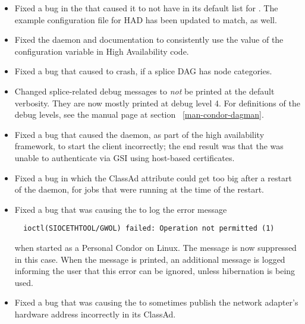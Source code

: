 \begin{itemize}
\item Fixed a bug in the  that caused it to not have
   in its default list for .
  The example
  configuration file for HAD has been updated to match, as well.

\item Fixed the  daemon and documentation to consistently
  use the value of the configuration variable 
   in High Availability code.

\item Fixed a bug that caused  to crash,
if a splice DAG has node categories.

\item Changed splice-related  debug messages
to \emph{not} be printed at the default verbosity.
They are now mostly printed at debug level 4.
For definitions of the debug levels, see the  manual
page at section~ \ref{man-condor-dagman}.

\item Fixed a bug that caused the  daemon,
  as part of the high availability framework,
  to start the  client incorrectly; the end result was
  that the  was unable to authenticate via GSI
  using host-based certificates.

\item Fixed a bug in which the ClassAd attribute 
  could get too big after a restart of the  daemon,
  for jobs that were running at the time of the restart.

\item Fixed a bug that was causing the  to log the
  error message 
\begin{verbatim}
  ioctl(SIOCETHTOOL/GWOL) failed: Operation not permitted (1)
\end{verbatim}
  when started as a Personal Condor on Linux.
  The message is now suppressed in this case.  When the message is
  printed, an additional message is logged informing the user that
  this error can be ignored, unless hibernation is being used.

\item Fixed a bug that was causing the  to sometimes
  publish the network adapter's hardware address incorrectly in its
  ClassAd.


\end{itemize}
